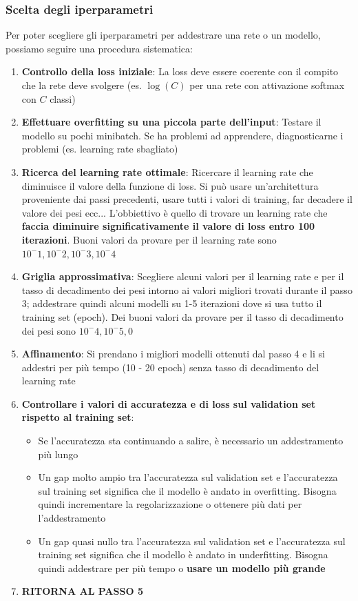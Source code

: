 \documentclass[12pt]{article}
\begin{document}
\subsubsection{Scelta degli iperparametri}
Per poter scegliere gli iperparametri per addestrare una rete o un modello, possiamo seguire una procedura sistematica:
\begin{enumerate}
    \item \textbf{Controllo della loss iniziale}: La loss deve essere coerente con il compito che la rete deve svolgere (es. $\log(C)$ per una rete con attivazione softmax con $C$ classi)
    \item \textbf{Effettuare overfitting su una piccola parte dell'input}: Testare il modello su pochi minibatch. Se ha problemi ad apprendere, diagnosticarne i problemi (es. learning rate sbagliato)
    \item \textbf{Ricerca del learning rate ottimale}: Ricercare il learning rate che diminuisce il valore della funzione di loss. Si può usare un'architettura proveniente dai passi precedenti, usare tutti i valori di training, far decadere il valore dei pesi ecc... 
    L'obbiettivo è quello di trovare un learning rate che \textbf{faccia diminuire significativamente il valore di loss entro 100 iterazioni}. Buoni valori da provare per il learning rate sono $10^-1, 10^-2, 10^-3, 10^-4$
    \item \textbf{Griglia approssimativa}: Scegliere alcuni valori per il learning rate e per il tasso di decadimento dei pesi intorno ai valori migliori trovati durante il passo 3; addestrare quindi alcuni modelli su 1-5 iterazioni dove si usa tutto il training set (epoch).
    Dei buoni valori da provare per il tasso di decadimento dei pesi sono $10^-4, 10^-5, 0$
    \item \textbf{Affinamento}: Si prendano i migliori modelli ottenuti dal passo 4 e li si addestri per più tempo (10 - 20 epoch) senza tasso di decadimento del learning rate
    \item \textbf{Controllare i valori di accuratezza e di loss sul validation set rispetto al training set}:
    \begin{itemize}
        \item Se l'accuratezza sta continuando a salire, è necessario un addestramento più lungo
        \item Un gap molto ampio tra l'accuratezza sul validation set e l'accuratezza sul training set significa che il modello è andato in overfitting. Bisogna quindi incrementare la regolarizzazione o ottenere più dati per l'addestramento
        \item Un gap quasi nullo tra l'accuratezza sul validation set e l'accuratezza sul training set significa che il modello è andato in underfitting. Bisogna quindi addestrare per più tempo o \textbf{usare un modello più grande}
    \end{itemize}
    \item \textbf{RITORNA AL PASSO 5}
\end{enumerate}
\end{document}
